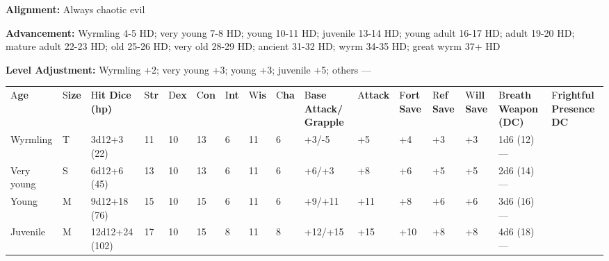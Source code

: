 \documentclass{article}
\begin{document}
\textbf{Alignment:} Always chaotic evil

\textbf{Advancement:} Wyrmling 4-5 HD; very young 7-8 HD; young 10-11 HD; juvenile 
13-14 HD; young adult 16-17 HD; adult 19-20 HD; mature adult 22-23 HD; old 25-26 
HD; very old 28-29 HD; ancient 31-32 HD; wyrm 34-35 HD; great wyrm 37+ HD 

\textbf{Level Adjustment:} Wyrmling +2; very young +3; young +3; juvenile +5; others 
---

\vspace{12pt}
\begin{tabular}{|>{\raggedright}p{18pt}|>{\raggedright}p{6pt}|>{\raggedright}p{18pt}|>{\raggedright}p{4pt}|>{\raggedright}p{5pt}|>{\raggedright}p{6pt}|>{\raggedright}p{4pt}|>{\raggedright}p{5pt}|>{\raggedright}p{6pt}|>{\raggedright}p{14pt}|>{\raggedright}p{10pt}|>{\raggedright}p{8pt}|>{\raggedright}p{8pt}|>{\raggedright}p{8pt}|>{\raggedright}p{15pt}|>{\raggedright}p{17pt}|}
\hline
\multicolumn{16}{|p{158pt}|}{W\textbf{hite Dragons by Age}}\tabularnewline
\hline
A{\small{}\textbf{ge}} & S{\small{}\textbf{ize}} & H{\small{}\textbf{it Dice (hp)}} & S{\small{}\textbf{tr}} & D{\small{}\textbf{ex}} & C{\small{}\textbf{on}} & I{\small{}\textbf{nt}} & W{\small{}\textbf{is}} & C{\small{}\textbf{ha}} & B{\small{}\textbf{ase 
Attack/}}\linebreak{}
{\small{}\textbf{Grapple}} & A{\small{}\textbf{ttack}} & F{\small{}\textbf{ort 
Save}} & R{\small{}\textbf{ef Save}} & W{\small{}\textbf{ill Save}} & B{\small{}\textbf{reath 
Weapon (DC)}} & F{\small{}\textbf{rightful Presence DC}}\tabularnewline
\hline
W{\small{}yrmling} & T & 3{\small{}d12+3 (22)} & 1{\small{}1} & 1{\small{}0} & 1{\small{}3} & 6 & 1{\small{}1} & 6 & +{\small{}3/-5} & +{\small{}5} & +{\small{}4} & +{\small{}3} & +{\small{}3} & 1{\small{}d6 
(12)}--- & \tabularnewline
\hline
V{\small{}ery young} & S & 6{\small{}d12+6 (45)} & 1{\small{}3} & 1{\small{}0} & 1{\small{}3} & 6 & 1{\small{}1} & 6 & +{\small{}6/+3} & +{\small{}8} & +{\small{}6} & +{\small{}5} & +{\small{}5} & 2{\small{}d6 
(14)}--- & \tabularnewline
\hline
Y{\small{}oung} & M & 9{\small{}d12+18 (76)} & 1{\small{}5} & 1{\small{}0} & 1{\small{}5} & 6 & 1{\small{}1} & 6 & +{\small{}9/+11} & +{\small{}11} & +{\small{}8} & +{\small{}6} & +{\small{}6} & 3{\small{}d6 
(16)}--- & \tabularnewline
\hline
J{\small{}uvenile} & M & 1{\small{}2d12+24 (102)} & 1{\small{}7} & 1{\small{}0} & 1{\small{}5} & 8 & 1{\small{}1} & 8 & +{\small{}12/+15} & +{\small{}15} & +{\small{}10} & +{\small{}8} & +{\small{}8} & 4{\small{}d6 
(18)}--- & \tabularnewline

\end{tabular}
\end{document}
